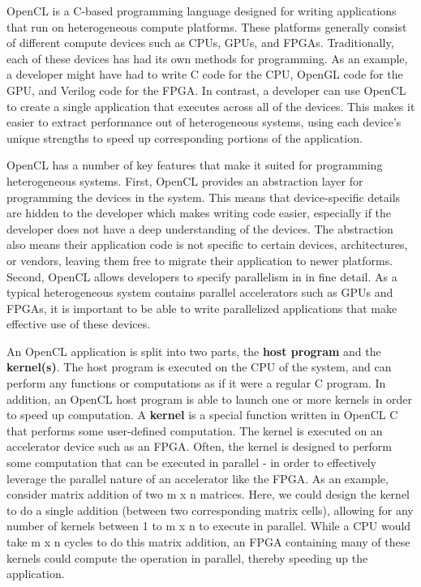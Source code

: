 \documentclass[11pt, twoside, pdftex]{article}
\begin{document}
OpenCL is a C-based programming language designed for writing applications that run on heterogeneous compute platforms. These platforms generally consist of different compute devices such as CPUs, GPUs, and FPGAs. Traditionally, each of these devices has had its own methods for programming. As an example, a developer might have had to write C code for the CPU, OpenGL code for the GPU, and Verilog code for the FPGA. In contrast, a developer can use OpenCL to create a single application that executes across all of the devices. This makes it easier to extract performance out of heterogeneous systems, using each device's unique strengths to speed up corresponding portions of the application.

OpenCL has a number of key features that make it suited for programming heterogeneous systems. First, OpenCL provides an abstraction layer for programming the devices in the system. This means that device-specific details are hidden to the developer which makes writing code easier, especially if the developer does not have a deep understanding of the devices. The abstraction also means their application code is not specific to certain devices, architectures, or vendors, leaving them free to migrate their application to newer platforms.  Second, OpenCL allows developers to specify parallelism in in fine detail. As a typical heterogeneous system contains parallel accelerators such as GPUs and FPGAs, it is important to be able to write parallelized applications that make effective use of these devices.

An OpenCL application is split into two parts, the \textbf{host program} and the \textbf{kernel(s)}. The host program is executed on the CPU of the system, and can perform any functions or computations as if it were a regular C program. In addition, an OpenCL host program is able to launch one or more kernels in order to speed up computation. A \textbf{kernel} is a special function written in OpenCL C that performs some user-defined computation. The kernel is executed on an accelerator device such as an FPGA. Often, the kernel is designed to perform some computation that can be executed in parallel - in order to effectively leverage the parallel nature of an accelerator like the FPGA. As an example, consider matrix addition of two m x n matrices. Here, we could design the kernel to do a single addition (between two corresponding matrix cells), allowing for any number of kernels between 1 to m x n to execute in parallel. While a CPU would take m x n cycles to do this matrix addition, an FPGA containing many of these kernels could compute the operation in parallel, thereby speeding up the application.
\end{document}
